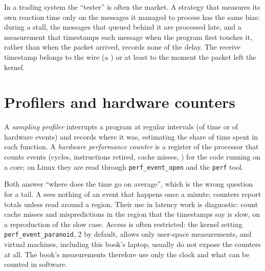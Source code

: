 In a trading system the ``tester'' is often the market. A strategy that measures its own reaction time only on the
messages it managed to process has the same bias: during a stall, the messages that queued behind it are processed late,
and a measurement that timestamps each message when the program first touches it, rather than when the packet arrived,
records none of the delay. The receive timestamp belongs to the wire (a ) or at least to the moment
the packet left the kernel.

\section{Profilers and hardware counters}

\begin{definition}\label{def:ll:measuring-latency:prof}
A \emph{sampling profiler} interrupts a program at regular intervals (of time or of hardware
events) and records where it was, estimating the share of time spent in each function. A \emph{hardware performance
counter} is a register of the processor that counts events (cycles, instructions
retired, cache misses, ) for the code running on a core; on Linux they are read through
\texttt{perf\_event\_open} and the \texttt{perf} tool.
\end{definition}

Both answer ``where does the time go on average'', which is the wrong question for a tail. A  sees
nothing of an event that happens once a minute; counters report totals unless read around a region. Their use in latency
work is diagnostic: count cache misses and mispredictions in the region that the timestamps say is slow, on a
reproduction of the slow case. Access is often restricted: the kernel setting \texttt{perf\_event\_paranoid}, 2 by default,
allows only user-space measurements, and virtual machines, including this book's laptop, usually do not expose the
counters at all. The book's measurements therefore use only the clock and what can be counted in software.

